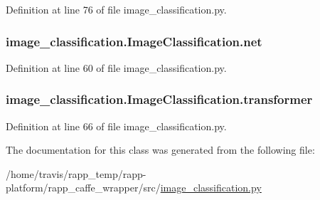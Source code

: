 Definition at line 76 of file image\-\_\-classification.\-py.

\hypertarget{classimage__classification_1_1ImageClassification_a6d94c2cec465652b7330a0f3e513453c}{
\subsubsection[{net}]{\setlength{\rightskip}{0pt plus 5cm}image\-\_\-classification.\-Image\-Classification.\-net}}\label{classimage__classification_1_1ImageClassification_a6d94c2cec465652b7330a0f3e513453c}


Definition at line 60 of file image\-\_\-classification.\-py.

\hypertarget{classimage__classification_1_1ImageClassification_ab0eca59e05e6226695a9475966734c0f}{
\subsubsection[{transformer}]{\setlength{\rightskip}{0pt plus 5cm}image\-\_\-classification.\-Image\-Classification.\-transformer}}\label{classimage__classification_1_1ImageClassification_ab0eca59e05e6226695a9475966734c0f}


Definition at line 66 of file image\-\_\-classification.\-py.



The documentation for this class was generated from the following file\-:\begin{DoxyCompactItemize}
\item 
/home/travis/rapp\-\_\-temp/rapp-\/platform/rapp\-\_\-caffe\-\_\-wrapper/src/\hyperlink{image__classification_8py}{image\-\_\-classification.\-py}\end{DoxyCompactItemize}
